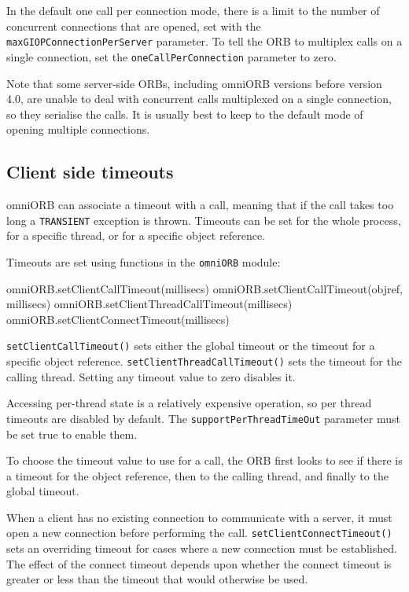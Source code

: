 \documentclass[11pt,twoside,a4paper]{book}
\newcommand{\code}[1]{\texttt{#1}}
\newcommand{\op}[1]{\texttt{#1()}}
\newcommand{\dsc}{\discretionary{}{}{}}
\begin{document}
In the default one call per connection mode, there is a limit to the
number of concurrent connections that are opened, set with the
\code{maxGIOPConnection\dsc{}PerServer} parameter. To tell the ORB to
multiplex calls on a single connection, set the
\code{oneCallPerConnection} parameter to zero.

Note that some server-side ORBs, including omniORB versions before
version 4.0, are unable to deal with concurrent calls multiplexed on a
single connection, so they serialise the calls. It is usually best to
keep to the default mode of opening multiple connections.


\subsection{Client side timeouts}
\label{sec:timeoutAPI}

omniORB can associate a timeout with a call, meaning that if the call
takes too long a \code{TRANSIENT} exception is thrown. Timeouts can be
set for the whole process, for a specific thread, or for a specific
object reference.

Timeouts are set using functions in the \code{omniORB} module:

\begin{pylisting}
omniORB.setClientCallTimeout(millisecs)
omniORB.setClientCallTimeout(objref, millisecs)
omniORB.setClientThreadCallTimeout(millisecs)
omniORB.setClientConnectTimeout(millisecs)
\end{pylisting}

\op{setClientCallTimeout} sets either the global timeout or the
timeout for a specific object reference.
\op{setClientThreadCallTimeout} sets the timeout for the calling
thread. Setting any timeout value to zero disables it.

Accessing per-thread state is a relatively expensive operation, so per
thread timeouts are disabled by default. The
\code{supportPerThreadTimeOut} parameter must be set true to enable
them.

To choose the timeout value to use for a call, the ORB first looks to
see if there is a timeout for the object reference, then to the
calling thread, and finally to the global timeout.


When a client has no existing connection to communicate with a server,
it must open a new connection before performing the
call. \op{setClientConnect\dsc{}Timeout} sets an overriding timeout for
cases where a new connection must be established. The effect of the
connect timeout depends upon whether the connect timeout is greater
or less than the timeout that would otherwise be used.
\end{document}
